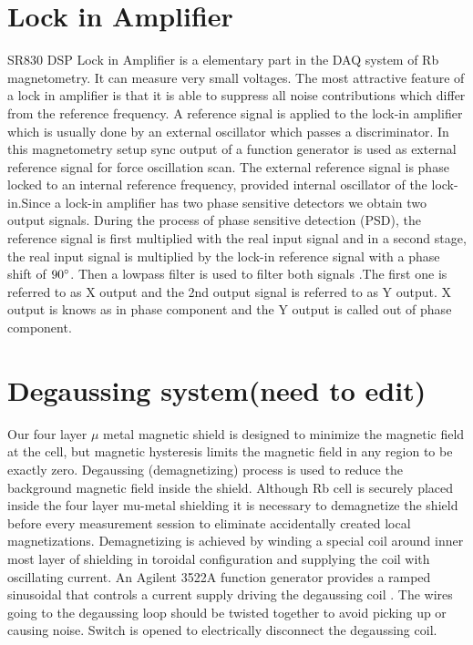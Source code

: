 \documentclass[12pt]{report}
\begin{document}
\section{Lock in Amplifier}
SR830 DSP Lock in Amplifier is a elementary part in the DAQ system of Rb magnetometry. It can measure very  small voltages. The most attractive feature of a lock in amplifier is that it is able to suppress all noise contributions which differ from the reference frequency. A reference signal is applied to the lock-in amplifier which is usually done by an external oscillator which passes a discriminator. In this magnetometry setup sync output of a function generator is used as external reference signal for force oscillation scan. The external reference signal is phase locked to an internal reference frequency, provided internal oscillator of the lock-in.Since a lock-in amplifier has two phase sensitive detectors we obtain two output signals. During the process of phase sensitive detection (PSD), the reference signal is first multiplied with the real input signal  and in a second stage, the real input signal is multiplied by
the lock-in reference signal with a phase shift of $90\degree$. Then a lowpass filter is used to filter both signals .The first one is referred to as X output and the 2nd output signal is referred to as Y output. X output is knows as in phase component and the Y output is called out of phase component.
\section{Degaussing system(need to edit)}
Our four layer $\mu$ metal magnetic shield is designed to minimize the magnetic field at the cell, but
magnetic hysteresis limits the magnetic field in any region to be exactly zero. Degaussing (demagnetizing) process is used to reduce the background magnetic field inside the shield. Although Rb cell is securely placed inside the four layer mu-metal shielding it is necessary to demagnetize the shield before every measurement session  to eliminate accidentally created local magnetizations.
Demagnetizing is achieved by winding a special coil around inner most layer of shielding  in toroidal configuration
and supplying the coil with oscillating current. An Agilent 3522A function generator  provides a ramped sinusoidal that controls a current supply driving the degaussing coil \cite{Martin:2014foa}. The wires going to the degaussing loop should be twisted together to avoid picking up or causing noise. Switch is opened to electrically disconnect the degaussing coil.
 
\end{document}
